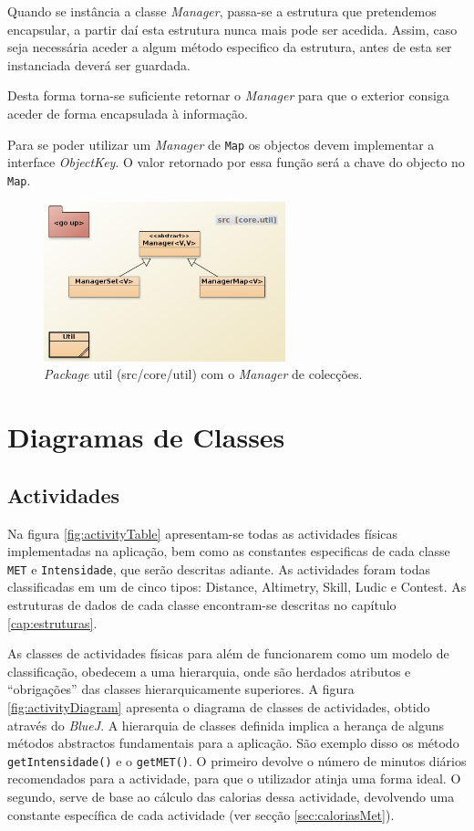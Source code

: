 \documentclass[a4paper,10pt]{report}
\begin{document}
Quando se instância a classe \emph{Manager}, passa-se a estrutura que pretendemos encapsular, a partir daí esta estrutura nunca mais 
pode ser acedida. Assim, caso seja necessária aceder a algum método especifico da estrutura, antes de esta ser instanciada deverá ser guardada.

Desta forma torna-se suficiente retornar o \emph{Manager} para que o exterior consiga aceder de forma encapsulada à informação.

Para se poder utilizar um \emph{Manager} de \verb!Map! os objectos devem implementar a interface \emph{ObjectKey}. 
O valor retornado por essa função será a chave do objecto no \verb!Map!.

\begin{figure}
\centering
\includegraphics[width=7cm]{coreUtil.png}
\caption{\emph{Package} util (src/core/util) com o \emph{Manager} de colecções.}
\label{fig:manager}
\end{figure}

\section{Diagramas de Classes}
\label{sec:classes}
\subsection{Actividades}
\label{subsec:actividadesDiagrama}
Na figura \ref{fig:activityTable} apresentam-se todas as actividades físicas implementadas na aplicação, 
bem como as constantes especificas de cada classe \verb!MET! e \verb!Intensidade!, que serão descritas adiante.
As actividades foram todas classificadas em um de cinco tipos: Distance, Altimetry, Skill, Ludic e Contest.
As estruturas de dados de cada classe encontram-se descritas no capítulo \ref{cap:estruturas}.

As classes de actividades físicas para além de funcionarem como um modelo de classificação, 
obedecem a uma hierarquia, onde são herdados atributos e ``obrigações'' das classes hierarquicamente superiores.
A figura \ref{fig:activityDiagram} apresenta o diagrama de classes de actividades, obtido através do \emph{BlueJ}.
A hierarquia de classes definida implica a herança de alguns métodos abstractos fundamentais para a aplicação.
São exemplo disso os método \verb!getIntensidade()! e o \verb!getMET()!.
O primeiro devolve o número de minutos diários recomendados para a actividade, para que o utilizador atinja uma forma ideal. 
O segundo, serve de base ao cálculo das calorias dessa actividade, devolvendo uma constante específica de cada actividade (ver secção \ref{sec:caloriasMet}).
\end{document}
